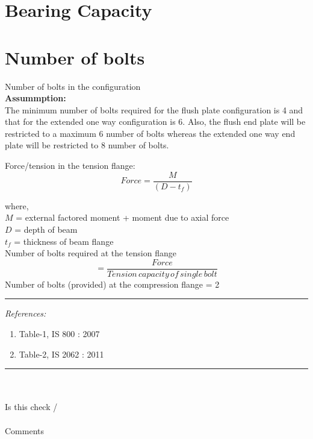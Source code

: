 \documentclass[11.5pt,a4paper,oneside]{report}
\newcommand{\okornot}{ \vspace{15mm} \hrule
	\noindent \\ \\
	Is this check \qquad
	\CheckBox[checked=False, name= ok]{\textbf{Ok}} \qquad / 
	\CheckBox[checked=False, name= notok]{\textbf{Not Ok}}\\ \\
	Comments \\ \\
	\noindent
	\TextField[name=multilinetextbox, multiline=true, width=1.0\linewidth,height=2in]{}}
\newcommand{\checkrefernces} {
	\vspace{15mm} \hrule \vspace{2mm}
	\textit{References:}}
\begin{document}
\begin{Form}
\section{Bearing Capacity}
\section{Number of bolts}
\large Number of bolts in the configuration \\
	
	\textbf{Assummption:} \\
	
	The minimum number of bolts required for the flush plate configuration is 4 and that for the extended one way configuration is 6. 
	Also, the flush end plate will be restricted to a maximum 6 number of bolts whereas the extended one way end plate will be restricted to 8 number of bolts.
	
	\vspace{5mm}
					
	Force/tension in the tension flange:
		\begin{equation}
			\boxed{Force = \frac{M}{(D - t_{f})}}
		\end{equation}
		
			where, \\
			$M$ = external factored moment + moment due to axial force \\
			$D$ = depth of beam \\
			$t_{f}$ = thickness of beam flange \\
			
			Number of bolts required at the tension flange
			\begin{equation}
				\boxed{= \frac{Force}{Tension \, capacity\, of\, single\, bolt}} 
			\end{equation}
			Number of bolts (provided) at the compression flange = 2
			
		\checkrefernces
			\begin{enumerate}
				\item Table-1, IS 800 : 2007
				\item Table-2, IS 2062 : 2011
			\end{enumerate}
		\okornot
		


\end{Form}
\end{document}
